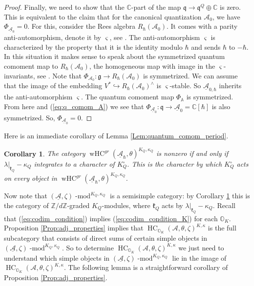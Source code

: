 \documentclass[12pt]{amsart}
\newcommand{\C}{\mathbb{C}}
\newcommand{\A}{\mathcal{A}}
\newcommand{\g}{\mathfrak{g}}
\newcommand{\Orb}{\mathbb{O}}
\newcommand{\Z}{\mathbb{Z}}
\newcommand{\kf}{\mathfrak{k}}
\newcommand{\HC}{\operatorname{HC}}
\newcommand{\q}{\mathfrak{q}}
\newcommand{\wHC}{\operatorname{wHC}}
\newtheorem{Cor}[Thm]{Corollary}
\theoremstyle{definition}
\numberwithin{equation}{section}
\begin{document}
\begin{proof}
Finally, we need to show that the $\C$-part of the map $\q\rightarrow \q^Q\oplus \C$
is zero.  This is equivalent to the claim that for the canonical quantization $\A_0$, we have
$\Phi_{\underline{\A}_0}=0$. For this, consider the Rees algebra $R_\hbar(\A_0)$.
It comes with a parity anti-automorphism, denote it by $\varsigma$, see
\cite[Corollary 2.3.3]{quant_iso}. The anti-automorphism $\varsigma$ is
characterized by the property that it is the identity modulo $\hbar$ and sends
$\hbar$ to $-\hbar$. In this situation it makes sense to speak about
the symmetrized quantum comoment map to $R_\hbar(\A_0)$, the homogeneous
map with image in the $\varsigma$-invariants,  see \cite[Section 5.4]{quant_iso}.
Note that $\Phi_{\A_0}:\g
\rightarrow R_\hbar(\A_0)$ is symmetrized. We can assume that the image of the embedding
$V^*\hookrightarrow R_\hbar(\A_0)^\wedge$ is $\varsigma$-stable. So $\underline{\A}_{0,\hbar}$
inherits the anti-automorphism $\varsigma$. The quantum comoment map $\Phi_{\mathbb{A}}$
is symmetrized. From here and (\ref{eq:q_comom_A}) we see that
$\Phi_{\underline{\A}_0}:\q\rightarrow \underline{\A}_{0}=\C[\hbar]$
is also symmetrized. So,   $\Phi_{\underline{\A}_0}=0$.
\end{proof}

Here is an immediate corollary of Lemma \ref{Lem:quantum_comom_period}.

\begin{Cor}\label{Cor:equiv_condition} 
The category $\wHC^{gr}(\underline{\A}_\hbar,\theta)^{K_Q,\kappa_Q}$ is nonzero if and only if $\lambda|_{\kf_Q}-\kappa_Q$
integrates to a character of $K_Q^\circ$. This is the character by which $K_Q^\circ$
acts on every object in $\wHC^{gr}(\underline{\A}_\hbar,\theta)^{K_Q,\kappa_Q}$.
\end{Cor}


Now note that $(\underline{\A},\zeta)\operatorname{-mod}^{K_Q,\kappa_Q}$ is a semisimple category:
by Corollary \ref{Cor:equiv_condition} this is the category of $\Z/d\Z$-graded $K_Q$-modules, where
$\mathfrak{k}_Q$ acts by $\lambda|_{\kf_Q}-\kappa_Q$.
Recall that (\ref{eq:codim_condition}) implies (\ref{eq:codim_condition_K}) for each $\Orb_K$.
Proposition \ref{Prop:adj_properties} implies that $\HC_{\Orb_K}(\A,\theta,\zeta)^{K,\kappa}$
is the full subcategory that consists of direct sums of certain simple objects in
$(\underline{\A},\zeta)\operatorname{-mod}^{K_Q,\kappa_Q}$. So to determine $\HC_{\Orb_K}(\A,\theta,\zeta)^{K,\kappa}$ we just need to understand which simple
objects in $(\underline{\A},\zeta)\operatorname{-mod}^{K_Q,\kappa_Q}$ lie in the image of $\HC_{\Orb_K}(\A,\theta,\zeta)^{K,\kappa}$. The following lemma is
a straightforward corollary of Proposition \ref{Prop:adj_properties}.
\end{document}

